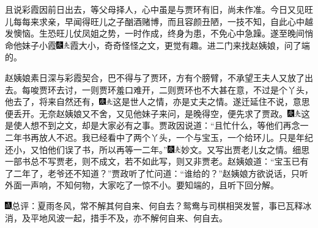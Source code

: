 且说彩霞因前日出去，等父母择人，心中虽是与贾环有旧，尚未作准。今日又见旺儿每每来求亲，早闻得旺儿之子酗酒赌博，而且容颜丑陋，一技不知，自此心中越发懊恼。生恐旺儿仗凤姐之势，一时作成，终身为患，不免心中急躁。遂至晚间悄命他妹子小霞{\includegraphics[width=3mm]{../Images/00004}\includegraphics[width=3mm]{../Images/00012}\footnotesize \kaishu 霞大小，奇奇怪怪之文，更觉有趣。}进二门来找赵姨娘，问了端的。

赵姨娘素日深与彩霞契合，巴不得与了贾环，方有个膀臂，不承望王夫人又放了出去。每唆贾环去讨，一则贾环羞口难开，二则贾环也不大甚在意，不过是个丫头，他去了，将来自然还有，{\includegraphics[width=3mm]{../Images/00004}\includegraphics[width=3mm]{../Images/00012}\footnotesize \kaishu 这是世人之情，亦是丈夫之情。}遂迁延住不说，意思便丢开。无奈赵姨娘又不舍，又见他妹子来问，是晚得空，便先求了贾政。{\includegraphics[width=3mm]{../Images/00004}\includegraphics[width=3mm]{../Images/00012}\footnotesize \kaishu 这是使人想不到之文，却是大家必有之事。}贾政因说道：``且忙什么，等他们再念一二年书再放人不迟。我已经看中了两个丫头，一个与宝玉，一个给环儿。只是年纪还小，又怕他们误了书，所以再等一二年。''{\includegraphics[width=3mm]{../Images/00004}\includegraphics[width=3mm]{../Images/00012}\footnotesize \kaishu 妙文。又写出贾老儿女之情。细思一部书总不写贾老，则不成文，若不如此写，则又非贾老。}赵姨娘道：``宝玉已有了二年了，老爷还不知道？''贾政听了忙问道：``谁给的？''赵姨娘方欲说话，只听外面一声响，不知何物，大家吃了一惊不小。要知端的，且听下回分解。

{\includegraphics[width=3mm]{../Images/00005}\kaishu 总评：夏雨冬风，常不解其何自来、何自去？鸳鸯与司棋相哭发誓，事已瓦释冰消，及平地风波一起，措手不及，亦不解何自来、何自去。}

